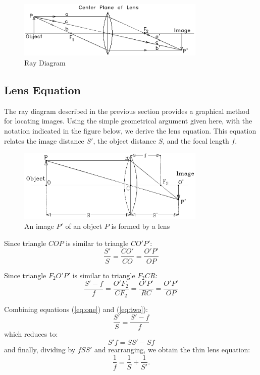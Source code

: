 \begin{figure}[h]
\centering
\includegraphics[width=0.8\textwidth]{./Exp6/pic/image3.png}
\caption{Ray Diagram}
\end{figure} 

\subsection{Lens Equation}
\label{sec:lens}
The ray diagram described in the previous section provides a graphical method for locating images. Using the simple geometrical argument given here, with the notation indicated in the figure below, we derive the lens equation. This equation relates the image distance $S'$, the object distance $S$, and the focal length $f$.
\begin{figure}[h]
\centering
\includegraphics[width=0.8\textwidth]{./Exp6/pic/image4.png}
\caption{An image $P'$ of an object $P$ is formed by a lens}
\end{figure} 

Since triangle $COP$ is similar to triangle $CO'P'$:
\begin{equation}
  \frac{S'}{S}=\frac{CO'}{CO}=\frac{O'P'}{OP}
  \label{eq:one}
\end{equation}

Since triangle $F_2O'P'$ is similar to triangle $F_2CR$:
\begin{equation}
  \label{eq:two}
  \frac{S'-f}{f}=\frac{O'F_{2}}{CF_{2}}=\frac{O'P'}{RC}=\frac{O'P'}{OP}
\end{equation}

Combining equations ({\ref{eq:one}}) and ({\ref{eq:two}}):
\begin{equation}
  \frac{S'}{S}=\frac{S'-f}{f}
\end{equation}
which reduces to:
\begin{equation}
  S'f=SS'-Sf
\end{equation}
and finally, dividing by $fSS'$ and rearranging, we obtain the thin lens equation:
\begin{equation}
  \frac{1}{f}=\frac{1}{S}+\frac{1}{S'}.
\end{equation}

